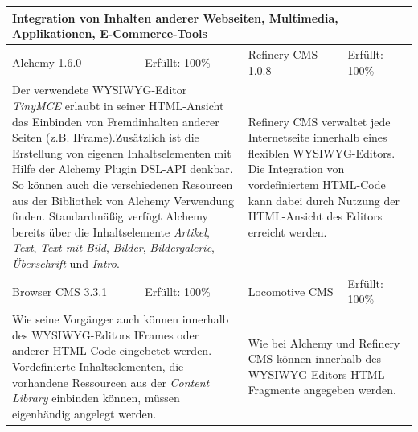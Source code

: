 \begin{tabular}[!ht]{|l|l|l|l|}
\hline
\multicolumn{4}{|p{15cm}|}{\textbf{Integration von Inhalten anderer Webseiten, Multimedia, Applikationen, E-Commerce-Tools}} \\
\hline
  Alchemy 1.6.0 & \cellcolor{green}Erfüllt: 100\% & Refinery CMS 1.0.8 & \cellcolor{green}Erfüllt: 100\% \\
  \hline
  \multicolumn{2}{|p{7.5cm}|}{Der verwendete WYSIWYG-Editor \emph{TinyMCE} erlaubt in seiner HTML-Ansicht das Einbinden von Fremdinhalten anderer Seiten (z.B. IFrame).Zusätzlich ist die Erstellung von eigenen Inhaltselementen mit Hilfe der Alchemy Plugin DSL-API denkbar. So können auch die verschiedenen Resourcen aus der Bibliothek von Alchemy Verwendung finden. Standardmäßig verfügt Alchemy bereits über die Inhaltselemente \emph{Artikel}, \emph{Text}, \emph{Text mit Bild}, \emph{Bilder}, \emph{Bildergalerie}, \emph{Überschrift} und \emph{Intro}.}
   & \multicolumn{2}{p{7.5cm}|}{Refinery CMS verwaltet jede Internetseite innerhalb eines flexiblen WYSIWYG-Editors. Die Integration von vordefiniertem HTML-Code kann dabei durch Nutzung der HTML-Ansicht des Editors erreicht werden.
} \\
  \hline
  Browser CMS 3.3.1 & \cellcolor{green}Erfüllt: 100\% & Locomotive CMS & \cellcolor{green}Erfüllt: 100\% \\
  \hline
  \multicolumn{2}{|p{7.5cm}|}{Wie seine Vorgänger auch können innerhalb des WYSIWYG-Editors IFrames oder anderer HTML-Code eingebetet werden. Vordefinierte Inhaltselementen, die vorhandene Ressourcen aus der \emph{Content Library} einbinden können, müssen eigenhändig angelegt werden.} & \multicolumn{2}{p{7.5cm}|}{Wie bei Alchemy und Refinery CMS können innerhalb des  WYSIWYG-Editors HTML-Fragmente angegeben werden.} \\
\hline
\end{tabular}
\newline
\newline
\newline
